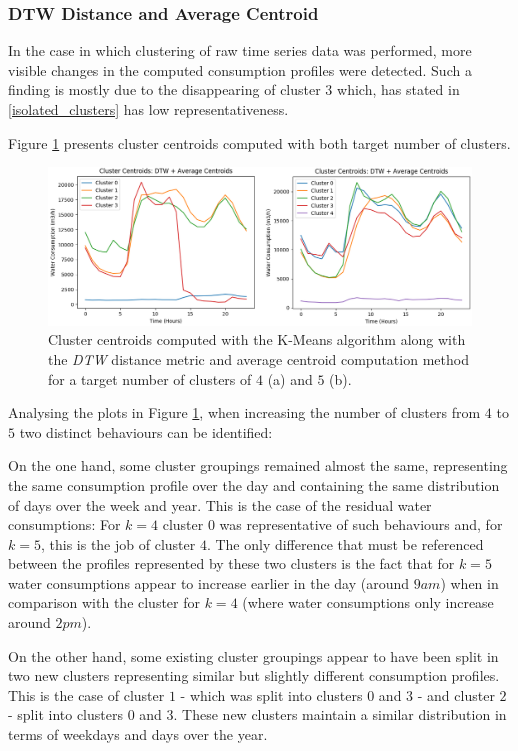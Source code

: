 \documentclass[9pt,journal,compsoc]{IEEEtran}
\begin{document}
\subsubsection{DTW Distance and Average Centroid}

In the case in which clustering of raw time series data was performed, more visible changes in the computed consumption profiles were detected. Such a finding is mostly due to the disappearing of cluster $3$ which, has stated in \ref{isolated_clusters} has low representativeness.

Figure \ref{comparison_clusters_45_dtw} presents cluster centroids computed with both target number of clusters.

\begin{figure}
	\centering
	\includegraphics[scale=0.4]{images/centroids_45_clusters_dtw.png}
	\caption{Cluster centroids computed with the K-Means algorithm along with the \emph{DTW} distance metric and average centroid computation method for a target number of clusters of $4$ (a) and $5$ (b).}
	\label{comparison_clusters_45_dtw}
\end{figure}

Analysing the plots in Figure \ref{comparison_clusters_45_dtw}, when increasing the number of clusters from $4$ to $5$ two distinct behaviours can be identified:

On the one hand, some cluster groupings remained almost the same, representing the same consumption profile over the day and containing the same distribution of days over the week and year. This is the case of the residual water consumptions: For $k=4$ cluster $0$ was representative of such behaviours and, for $k=5$, this is the job of cluster $4$. The only difference that must be referenced between the profiles represented by these two clusters is the fact that for $k=5$ water consumptions appear to increase earlier in the day (around $9am$) when in comparison with the cluster for $k=4$ (where water consumptions only increase around $2pm$).

On the other hand, some existing cluster groupings appear to have been split in two new clusters representing similar but slightly different consumption profiles. This is the case of cluster $1$ - which was split into clusters $0$ and $3$ - and cluster $2$ - split into clusters $0$ and $3$. These new clusters maintain a similar distribution in terms of weekdays and days over the year.
\end{document}
